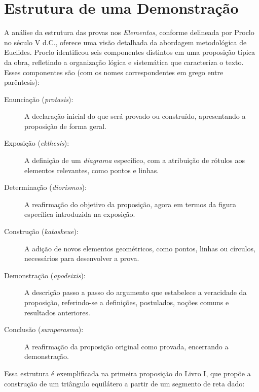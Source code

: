\documentclass{hipatia}
\begin{document}
\section{Estrutura de uma Demonstração}

A análise da estrutura das provas nos \emph{Elementos},
conforme delineada por Proclo no século V d.C.,
oferece uma visão detalhada da abordagem
metodológica de Euclides. Proclo identificou seis
componentes distintos em uma proposição típica da
obra, refletindo a organização lógica e
sistemática que caracteriza o texto. Esses
componentes são (com os nomes correspondentes
em grego entre parêntesis): 
\begin{description}
	\item[Enunciação  (\emph{protasis}):] A declaração inicial do que
		será provado ou construído, apresentando a
		proposição de forma geral.
	\item[Exposição (\emph{ekthesis}):] A definição de um \emph{diagrama} 
	 específico, com
		a atribuição de rótulos aos elementos relevantes, como
		pontos e linhas.
	\item[Determinação  (\emph{diorismos}):] A reafirmação do objetivo da proposição, agora
		em termos da figura específica introduzida na exposição.
	\item[Construção (\emph{kataskeue}):] A adição de novos elementos geométricos,
	  como pontos, linhas
		ou círculos, necessários para desenvolver a prova.
	\item[Demonstração (\emph{apodeixis}):] A descrição passo a passo 
		do argumento que
		estabelece a veracidade da proposição, referindo-se a
		definições, 
		postulados, noções comuns e resultados anteriores.
	\item[Conclusão (\emph{sumperasma}):] A reafirmação da proposição
original como provada, encerrando a demonstração.
\end{description}
Essa estrutura é exemplificada na primeira
proposição do Livro I, que propõe a construção de
um triângulo equilátero a partir de um segmento de
reta dado:
\end{document}
